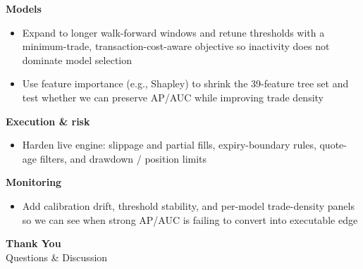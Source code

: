 \documentclass[english, xcolor=dvipsnames, aspectratio=169]{beamer}
\newcommand{\itemj}{\item \justifying}
\newcommand{\sectiontitle}{}
\begin{document}
\begin{frame}{\sectiontitle}
\footnotesize
\textbf{Models}
\begin{itemize}
    \itemj Expand to longer walk-forward windows and retune thresholds with a minimum-trade, transaction-cost-aware objective so inactivity does not dominate model selection
    \itemj Use feature importance (e.g., Shapley) to shrink the 39-feature tree set and test whether we can preserve AP/AUC while improving trade density
\end{itemize}

\vspace{0.1cm}
\textbf{Execution \& risk}
\begin{itemize}
    \itemj Harden live engine: slippage and partial fills, expiry-boundary rules, quote-age filters, and drawdown / position limits
\end{itemize}

\vspace{0.1cm}
\textbf{Monitoring}
\begin{itemize}
    \itemj Add calibration drift, threshold stability, and per-model trade-density panels so we can see when strong AP/AUC is failing to convert into executable edge
\end{itemize}
\end{frame}

\begin{frame}{}
    \centering
    \vspace{2cm}
    {\Large \textbf{Thank You}}\\[0.5cm]
    {\normalsize Questions \& Discussion}
\end{frame}
\end{document}

